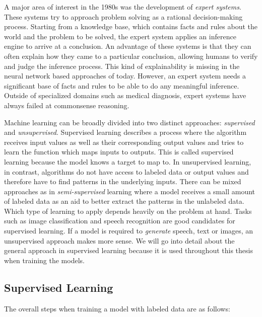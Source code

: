 \documentclass[draft,final]{vutinfth} %
\begin{document}
A major area of interest in the 1980s was the development of
\emph{expert systems}. These systems try to approach problem solving
as a rational decision-making process. Starting from a knowledge base,
which contains facts and rules about the world and the problem to be
solved, the expert system applies an inference engine to arrive at a
conclusion. An advantage of these systems is that they can often
explain how they came to a particular conclusion, allowing humans to
verify and judge the inference process. This kind of explainability is
missing in the neural network based approaches of today. However, an
expert system needs a significant base of facts and rules to be able
to do any meaningful inference. Outside of specialized domains such as
medical diagnosis, expert systems have always failed at commonsense
reasoning.

Machine learning can be broadly divided into two distinct approaches:
\emph{supervised} and \emph{unsupervised}. Supervised learning
describes a process where the algorithm receives input values as well
as their corresponding output values and tries to learn the function
which maps inputs to outputs. This is called supervised learning
because the model knows a target to map to. In unsupervised learning,
in contrast, algorithms do not have access to labeled data or output
values and therefore have to find patterns in the underlying
inputs. There can be mixed approaches as in \emph{semi-supervised}
learning where a model receives a small amount of labeled data as an
aid to better extract the patterns in the unlabeled data. Which type
of learning to apply depends heavily on the problem at hand. Tasks
such as image classification and speech recognition are good
candidates for supervised learning. If a model is required to
\emph{generate} speech, text or images, an unsupervised approach makes
more sense. We will go into detail about the general approach in
supervised learning because it is used throughout this thesis when
training the models.

\subsection{Supervised Learning}
\label{ssec:theory-sl}

The overall steps when training a model with labeled data are as
follows:
\end{document}
